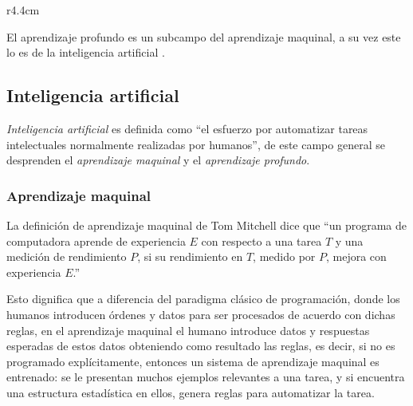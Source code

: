 \begin{wrapfigure}{r}{4.4cm}
	{\scriptsize El aprendizaje profundo es un subcampo del aprendizaje maquinal, a su vez este lo es de la inteligencia artificial \cite{cho18}.}
\end{wrapfigure}\label{fig:AI}\subsection {Inteligencia artificial}\label{subsec:intela}
\emph{Inteligencia artificial} es definida como ``el esfuerzo por automatizar tareas intelectuales normalmente realizadas por humanos''\cite{cho18}, de este campo general se desprenden el \emph{aprendizaje maquinal} y el \emph{aprendizaje profundo}.

\subsubsection {Aprendizaje maquinal}\label{subsec:machinel}
La definición de aprendizaje maquinal de Tom Mitchell\cite{mich19} dice que ``un programa de computadora aprende de experiencia $E$ con respecto a una tarea $T$ y una medición de rendimiento $P$, si su rendimiento en $T$, medido por $P$, mejora con experiencia $E$.''

Esto dignifica que a diferencia del paradigma clásico de programación, donde los humanos introducen órdenes y datos para ser procesados de acuerdo con dichas reglas, en el aprendizaje maquinal el humano introduce datos y respuestas esperadas de estos datos obteniendo como resultado las reglas, es decir, si no es programado explícitamente, entonces un sistema de aprendizaje maquinal es entrenado: se le presentan muchos ejemplos relevantes a una tarea, y si encuentra una estructura estadística en ellos, genera reglas para automatizar la tarea.
